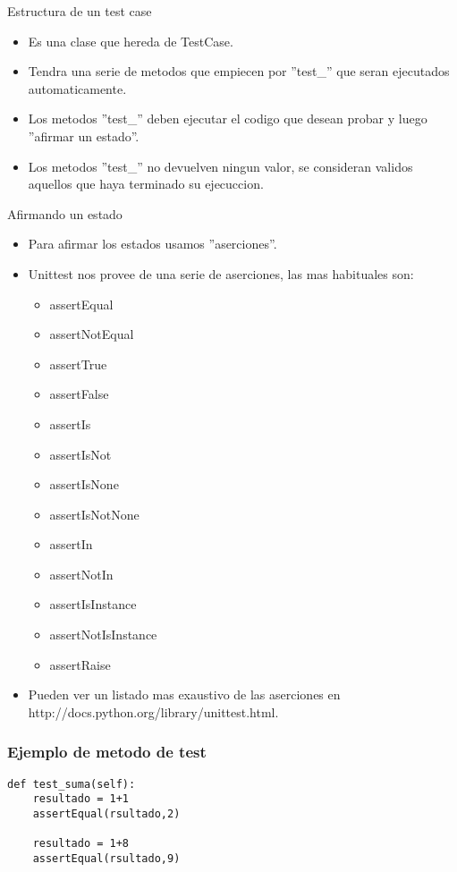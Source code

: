 \documentclass[10pt]{beamer}
\begin{document}
  \begin{frame}{Estructura de un test case}
    \begin{itemize}
      \item Es una clase que hereda de TestCase.
      \item Tendra una serie de metodos que empiecen por ''test\_'' que seran ejecutados automaticamente.
      \item Los metodos ''test\_'' deben ejecutar el codigo que desean probar y luego ''afirmar un estado''.
      \item Los metodos ''test\_'' no devuelven ningun valor, se consideran validos aquellos que haya terminado su ejecuccion.
    \end{itemize}
  \end{frame}

  \begin{frame}{Afirmando un estado}
    \begin{itemize}
      \item Para afirmar los estados usamos ''aserciones''.
      \item Unittest nos provee de una serie de aserciones, las mas habituales son:
      \begin{itemize}
        \item assertEqual
        \item assertNotEqual
        \item assertTrue
        \item assertFalse
        \item assertIs
        \item assertIsNot
        \item assertIsNone
        \item assertIsNotNone
        \item assertIn
        \item assertNotIn
        \item assertIsInstance
        \item assertNotIsInstance
        \item assertRaise
      \end{itemize}
      \item Pueden ver un listado mas exaustivo de las aserciones en http://docs.python.org/library/unittest.html.
    \end{itemize}
  \end{frame}

  \begin{frame}[containsverbatim]
    \frametitle{Ejemplo de metodo de test}
    \begin{verbatim}
def test_suma(self):
    resultado = 1+1
    assertEqual(rsultado,2)

    resultado = 1+8
    assertEqual(rsultado,9)
    \end{verbatim}
  \end{frame}
\end{document}
